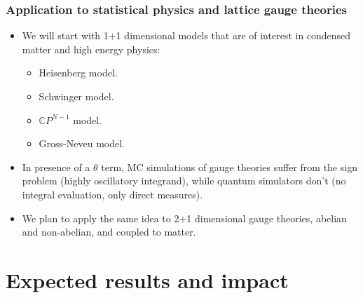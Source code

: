 \documentclass[10pt,t,xcolor=dvipsnames,aspectratio=169]{beamer}
\begin{document}
\begin{frame}
    \frametitle{Application to statistical physics and lattice gauge theories}
    \begin{itemize}
        \item
            We will start with 1+1 dimensional models that are of interest in condensed matter and high energy physics:
            \begin{itemize}
                \item Heisenberg model.
                \item Schwinger model.
                \item $\mathbb CP^{N-1}$ model.
                \item Gross-Neveu model.
            \end{itemize}
        \item
            In presence of a $\theta$ term, MC simulations of gauge theories suffer from the sign problem (highly oscillatory integrand),
            while quantum simulators don't (no integral evaluation, only direct measures).
        \item
            We plan to apply the same idea to 2+1 dimensional gauge theories, abelian and non-abelian, and coupled to matter.
    \end{itemize}
\end{frame}


\section{Expected results and impact}
\end{document}
